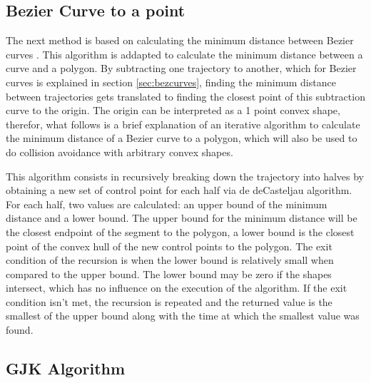 \subsection{Bezier Curve to a point}
\label{sec:bezcurvetopoint}

\par The next method is based on calculating the minimum distance between Bezier curves \cite{chang2011computation}. This algorithm is addapted to calculate the minimum distance between a curve and a polygon. By subtracting one trajectory to another, which for Bezier curves is explained in section \ref{sec:bezcurves}, finding the minimum distance between trajectories gets translated to finding the closest point of this subtraction curve to the origin. The origin can be interpreted as a 1 point convex shape, therefor, what follows is a brief explanation of an iterative algorithm to calculate the minimum distance of a Bezier curve to a polygon, which will also be used to do collision avoidance with arbitrary convex shapes.

\par This algorithm consists in recursively breaking down the trajectory into halves by obtaining a new set of control point for each half via de deCasteljau algorithm. For each half, two values are calculated: an upper bound of the minimum distance and a lower bound. The upper bound for the minimum distance will be the closest endpoint of the segment to the polygon, a lower bound is the closest point of the convex hull of the new control points to the polygon. The exit condition of the recursion is when the lower bound is relatively small when compared to the upper bound. The lower bound may be zero if the shapes intersect, which has no influence on the execution of the algorithm. If the exit condition isn't met, the recursion is repeated and the returned value is the smallest of the upper bound along with the time at which the smallest value was found.

\subsection{GJK Algorithm}
\label{sec:gjkalg}

